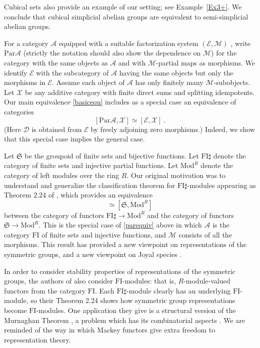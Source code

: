 \documentclass[a4paper,12pt,reqno]{amsart}
\theoremstyle{definition}
\theoremstyle{fact}
\theoremstyle{genquest}
\theoremstyle{step}
\newcommand{\ra}{\rightarrow}
\def\CA{{\mathscr A}}
\def\CD{{\mathscr D}}
\def\CE{{\mathscr E}}
\def\CM{{\mathscr M}}
\def\CX{{\mathscr X}}
\begin{document}
Cubical sets also provide an example of our setting; see Example~\ref{Ex3+}.
We conclude that cubical simplicial abelian groups are equivalent to semi-simplicial
abelian groups. 

For a category $\CA$ equipped with a suitable factorization system 
$(\CE,\CM)$ \cite{FreydKelly},
write $\mathrm{Par}\CA$ (strictly the notation should also show the dependence 
on $\CM$) for the category with the same objects as $\CA$ and
with $\CM$-partial maps as morphisms. We identify $\CE$ with the subcategory of
$\CA$ having the same objects but only the morphisms in $\CE$.
Assume each object of $\CA$ has only finitely many $\CM$-subobjects.
Let $\CX$ be any additive category with finite direct sums and splitting idempotents.
Our main equivalence \eqref{basicequ} includes as a special case an equivalence of categories
\begin{equation}\label{parequiv}
[\mathrm{Par}\CA,\CX] \simeq [\CE,\CX] \ .
\end{equation}
(Here $\CD$ is obtained from $\CE$ by freely adjoining zero morphisms.)
Indeed, we show that this special case implies the general case.

Let $\mathfrak{S}$ be the groupoid of finite sets and bijective functions.
Let $\mathrm{FI}\sharp$ denote the category of finite sets and injective partial functions.
Let $\mathrm{Mod}^R$ denote the category of left modules over the ring $R$.
Our original motivation was to understand and generalize the classification theorem for 
$\mathrm{FI}\sharp$-modules appearing as Theorem 2.24 of \cite{CEF2012},
which provides an equivalence 
\begin{equation*}
[\mathrm{FI}\sharp, \mathrm{Mod}^R] \simeq [\mathfrak{S}, \mathrm{Mod}^R]
\end{equation*}
between the category of functors $\mathrm{FI}\sharp \ra \mathrm{Mod}^R$
and the category of functors $\mathfrak{S} \ra \mathrm{Mod}^R$. 
This is the special case of \eqref{parequiv} above in which $\CA$ is
the category $\mathrm{FI}$ of finite sets and injective functions, 
and $\CM$ consists of all the morphisms. 
This result has provided a new viewpoint on representations of the 
symmetric groups, and a new viewpoint on Joyal species \cite{Species, AnalFunct}.

In order to consider stability properties of representations of the symmetric groups, 
the authors of \cite{CEF2012} also consider $\mathrm{FI}$-modules: 
that is, $R$-module-valued functors from the category $\mathrm{FI}$. 
Each $\mathrm{FI}\sharp$-module
clearly has an underlying $\mathrm{FI}$-module, so their Theorem 2.24
shows how symmetric group representations become $\mathrm{FI}$-modules.
One application they give is a structural version of the Murnaghan Theorem
\cite{Mur38, Mur55}, a problem which has its combinatorial aspects \cite{Sta99}. 
We are reminded of the way in which Mackey functors
\cite{Lindner1976, PanSt} give extra freedom to representation theory.
\end{document}

